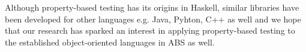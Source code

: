 Although property-based testing has its origins in Haskell, similar libraries have been developed for other languages e.g. Java, Pyhton, C++ as well and we hope that our research has sparked an interest in applying property-based testing to the established object-oriented languages in ABS as well.

%







